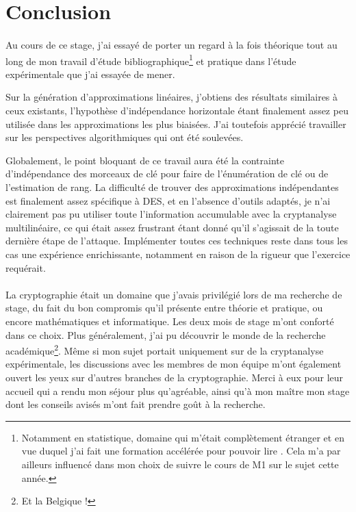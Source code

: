 \documentclass{scrartcl}
\begin{document}
\section{Conclusion}

\paragraph*{}
Au cours de ce stage, j'ai essayé de porter un regard à la fois théorique tout au long de
mon travail d'étude bibliographique\footnote{Notamment en statistique, domaine qui m'était complètement étranger
et en vue duquel j'ai fait une formation accélérée pour pouvoir lire \cite{TheseHermelin}. Cela m'a par ailleurs influencé dans mon choix de suivre
le cours de M1 sur le sujet cette année.} et pratique dans l'étude expérimentale que j'ai essayée de mener. 

Sur la génération d'approximations linéaires, j'obtiens des résultats similaires à ceux existants, l'hypothèse d'indépendance
horizontale étant finalement assez peu utilisée dans les approximations les plus biaisées. J'ai toutefois
apprécié travailler sur les perspectives algorithmiques qui ont été soulevées.

Globalement, le point bloquant de ce travail aura été la contrainte d'indépendance des morceaux de clé pour
faire de l'énumération de clé ou de l'estimation de rang. La difficulté de trouver des approximations indépendantes
est finalement assez spécifique à DES, et en l'absence d'outils adaptés, je n'ai
clairement pas pu utiliser toute l'information accumulable avec la cryptanalyse multilinéaire, ce qui était
assez frustrant étant donné qu'il s'agissait de la toute dernière étape de l'attaque. Implémenter toutes ces
techniques reste dans tous les cas une expérience enrichissante, notamment en raison de la rigueur que l'exercice
requérait.

\paragraph*{}
La cryptographie était un domaine que j'avais privilégié lors de ma recherche de stage, du fait du bon compromis qu'il présente entre
théorie et pratique, ou encore mathématiques et informatique. Les deux mois de
stage m'ont conforté dans ce choix. Plus généralement, j'ai pu découvrir le monde de la recherche académique\footnote{Et la Belgique !}. Même si mon
sujet portait uniquement sur de la cryptanalyse expérimentale, les
discussions avec les membres de mon équipe m'ont également ouvert les yeux sur d'autres branches de la
cryptographie. Merci à eux pour leur accueil qui a rendu mon séjour plus qu'agréable, ainsi qu'à mon maître mon stage
dont les conseils avisés m'ont fait prendre goût à la recherche.
\newpage
{}


\end{document}

